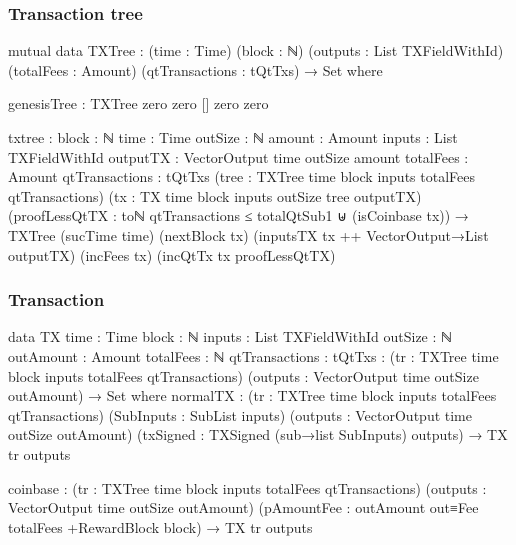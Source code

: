 \documentclass{beamer}
\begin{document}
\begin{frame}
  \frametitle{Transaction tree}
\begin{code}

      mutual
        data TXTree : (time : Time) (block : ℕ)
          (outputs : List TXFieldWithId)
          (totalFees : Amount)
          (qtTransactions : tQtTxs) → Set where

          genesisTree : TXTree zero zero [] zero zero

\end{code}
\end{frame}
\begin{frame}
\begin{code}

          txtree      :
            {block : ℕ} {time : Time}
            {outSize : ℕ} {amount : Amount}
            {inputs : List TXFieldWithId}
            {outputTX : VectorOutput time outSize amount}
            {totalFees : Amount} {qtTransactions : tQtTxs}
            (tree : TXTree time block inputs totalFees qtTransactions)
            (tx : TX {time} {block} {inputs} {outSize} tree outputTX)
            (proofLessQtTX :
                toℕ qtTransactions ≤ totalQtSub1
                ⊎
                (isCoinbase tx))
            → TXTree (sucTime time)
              (nextBlock tx)
              (inputsTX tx ++ VectorOutput→List outputTX)
              (incFees tx) (incQtTx tx proofLessQtTX)

\end{code}
\end{frame}
\begin{frame}
  \frametitle{Transaction}
\begin{code}

        data TX {time : Time} {block : ℕ}
            {inputs : List TXFieldWithId} {outSize : ℕ}
            {outAmount : Amount} {totalFees : ℕ}
            {qtTransactions : tQtTxs}
          : (tr : TXTree time block inputs totalFees qtTransactions)
            (outputs : VectorOutput time outSize outAmount)
            → Set where
          normalTX :
            (tr : TXTree time block inputs totalFees qtTransactions)
            (SubInputs : SubList inputs)
            (outputs : VectorOutput time outSize outAmount)
            (txSigned : TXSigned (sub→list SubInputs) outputs)
            → TX tr outputs

\end{code}
\end{frame}
\begin{frame}
\begin{code}

          coinbase :
            (tr : TXTree time block inputs totalFees qtTransactions)
            (outputs : VectorOutput time outSize outAmount)
            (pAmountFee : outAmount out≡Fee totalFees
              +RewardBlock block)
            → TX tr outputs

\end{code}
\end{frame}
\end{document}
